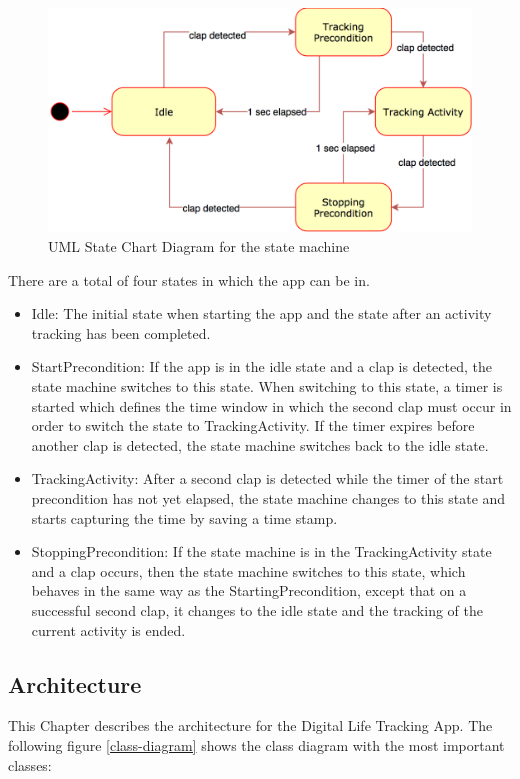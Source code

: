 \begin{figure}[H]
	\centering
	\includegraphics[width=1.0\linewidth]{./imgs/statemachine.png}
	\caption{UML State Chart Diagram for the state machine}
	\label{statemachine}
\end{figure}

There are a total of four states in which the app can be in. 
\begin{itemize}
\item Idle: The initial state when starting the app and the state after an activity tracking has been completed.
\item StartPrecondition: If the app is in the idle state and a clap is detected, the state machine switches to this state. When switching to this state, a timer is started which defines the time window in which the second clap must occur in order to switch the state to TrackingActivity. If the timer expires before another clap is detected, the state machine switches back to the idle state.
\item TrackingActivity: After a second clap is detected while the timer of the start precondition has not yet elapsed, the state machine changes to this state and starts capturing the time by saving a time stamp.
\item StoppingPrecondition: If the state machine is in the TrackingActivity state and a clap occurs, then the state machine switches to this state, which behaves in the same way as the StartingPrecondition, except that on a successful second clap, it changes to the idle state and the tracking of the current activity is ended.
\end{itemize}

\subsection{Architecture}
\label{sec:org393d659}
This Chapter describes the architecture for the Digital Life Tracking App. The following figure \ref{class-diagram} shows the class diagram with the most important classes:

